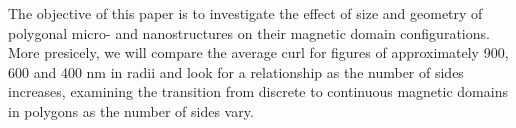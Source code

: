 The objective of this paper is to investigate the effect of size and geometry of polygonal micro- and nanostructures on their magnetic domain configurations. More presicely, we will compare the average curl for figures of approximately 900, 600 and 400 nm in radii and look for a relationship as the number of sides increases, examining the transition from discrete to continuous magnetic domains in polygons as the number of sides vary. %

